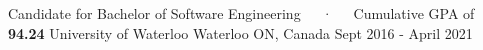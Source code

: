 
\begin{cventries}

  \cventry
    {Candidate for Bachelor of Software Engineering~~~·~~~Cumulative GPA of \textbf{94.24}} %
    {University of Waterloo} %
    {Waterloo ON, Canada} %
    {Sept 2016 - April 2021} %
    {
      \begin{cvitems} %
      \end{cvitems}
    }

\end{cventries}
